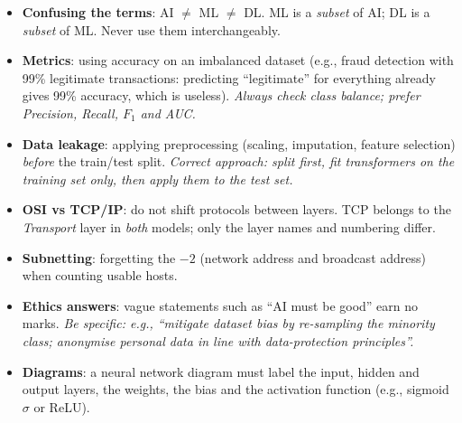 \documentclass[11pt]{article}
\begin{document}
\begin{attention}
\begin{itemize}
    \item \textbf{Confusing the terms}: AI $\neq$ ML $\neq$ DL. ML is a \emph{subset} of AI; DL is a \emph{subset} of ML. Never use them interchangeably.
    \item \textbf{Metrics}: using accuracy on an imbalanced dataset (e.g., fraud detection with 99\% legitimate transactions: predicting ``legitimate'' for everything already gives 99\% accuracy, which is useless). \emph{Always check class balance; prefer Precision, Recall, $F_1$ and AUC.}
    \item \textbf{Data leakage}: applying preprocessing (scaling, imputation, feature selection) \emph{before} the train/test split. \emph{Correct approach: split first, fit transformers on the training set only, then apply them to the test set.}
    \item \textbf{OSI vs TCP/IP}: do not shift protocols between layers. TCP belongs to the \emph{Transport} layer in \emph{both} models; only the layer names and numbering differ.
    \item \textbf{Subnetting}: forgetting the $-2$ (network address and broadcast address) when counting usable hosts.
    \item \textbf{Ethics answers}: vague statements such as ``AI must be good'' earn no marks. \emph{Be specific: e.g., ``mitigate dataset bias by re-sampling the minority class; anonymise personal data in line with data-protection principles''.}
    \item \textbf{Diagrams}: a neural network diagram must label the input, hidden and output layers, the weights, the bias and the activation function (e.g., sigmoid $\sigma$ or ReLU).
\end{itemize}
\end{attention}
\end{document}
